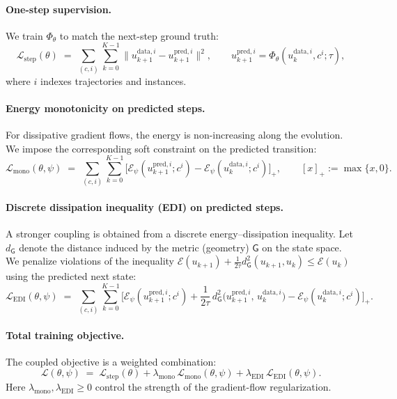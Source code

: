 \documentclass[11pt]{article}
\begin{document}
\paragraph{One-step supervision.}
We train $\Phi_\theta$ to match the next-step ground truth:
\begin{equation}
\label{eq:loss-step}
\mathcal L_{\mathrm{step}}(\theta)
\;=\;
\sum_{(c,i)}\sum_{k=0}^{K-1}
\big\|
u_{k+1}^{\mathrm{data},i}
-
u_{k+1}^{\mathrm{pred},i}
\big\|^2,
\qquad
u_{k+1}^{\mathrm{pred},i}=\Phi_\theta(u_k^{\mathrm{data},i},c^{i};\tau),
\end{equation}
where $i$ indexes trajectories and instances.

\paragraph{Energy monotonicity on predicted steps.}
For dissipative gradient flows, the energy is non-increasing along the evolution.
We impose the corresponding soft constraint on the predicted transition:
\begin{equation}
\label{eq:loss-mono-pred}
\mathcal L_{\mathrm{mono}}(\theta,\psi)
\;=\;
\sum_{(c,i)}\sum_{k=0}^{K-1}
\Big[
\mathcal E_\psi(u_{k+1}^{\mathrm{pred},i};c^{i})
-
\mathcal E_\psi(u_{k}^{\mathrm{data},i};c^{i})
\Big]_+,
\qquad [x]_+:= \max\{x,0\}.
\end{equation}

\paragraph{Discrete dissipation inequality (EDI) on predicted steps.}
A stronger coupling is obtained from a discrete energy--dissipation inequality.
Let $d_{\mathsf G}$ denote the distance induced by the metric (geometry) $\mathsf G$ on the state space.
We penalize violations of the inequality
\(
\mathcal E(u_{k+1}) + \frac{1}{2\tau} d_{\mathsf G}^2(u_{k+1},u_k) \le \mathcal E(u_k)
\)
using the predicted next state:
\begin{equation}
\label{eq:loss-edi-pred}
\mathcal L_{\mathrm{EDI}}(\theta,\psi)
\;=\;
\sum_{(c,i)}\sum_{k=0}^{K-1}
\Big[
\mathcal E_\psi(u_{k+1}^{\mathrm{pred},i};c^{i})
+
\frac{1}{2\tau}\,
d_{\mathsf G}^2\big(u_{k+1}^{\mathrm{pred},i},\,u_k^{\mathrm{data},i}\big)
-
\mathcal E_\psi(u_{k}^{\mathrm{data},i};c^{i})
\Big]_+.
\end{equation}

\paragraph{Total training objective.}
The coupled objective is a weighted combination:
\begin{equation}
\label{eq:loss-total-coupled}
\mathcal L(\theta,\psi)
\;=\;
\mathcal L_{\mathrm{step}}(\theta)
+
\lambda_{\mathrm{mono}}\,\mathcal L_{\mathrm{mono}}(\theta,\psi)
+
\lambda_{\mathrm{EDI}}\,\mathcal L_{\mathrm{EDI}}(\theta,\psi).
\end{equation}
Here $\lambda_{\mathrm{mono}},\lambda_{\mathrm{EDI}}\ge 0$ control the strength of the gradient-flow regularization.
\end{document}
